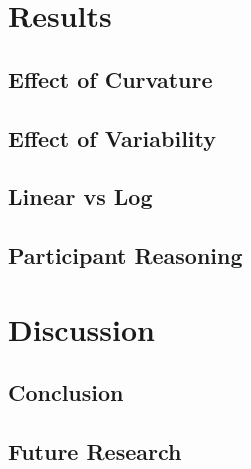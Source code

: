 \documentclass[]{interact}
\theoremstyle{plain}%
\theoremstyle{definition}
\theoremstyle{remark}
\begin{document}
\hypertarget{results}{%
\section{Results}\label{results}}

\hypertarget{effect-of-curvature}{%
\subsection{Effect of Curvature}\label{effect-of-curvature}}

\hypertarget{effect-of-variability}{%
\subsection{Effect of Variability}\label{effect-of-variability}}

\hypertarget{linear-vs-log}{%
\subsection{Linear vs Log}\label{linear-vs-log}}

\hypertarget{participant-reasoning}{%
\subsection{Participant Reasoning}\label{participant-reasoning}}

\hypertarget{discussion}{%
\section{Discussion}\label{discussion}}

\hypertarget{conclusion}{%
\subsection{Conclusion}\label{conclusion}}

\hypertarget{future-research}{%
\subsection{Future Research}\label{future-research}}
\end{document}
